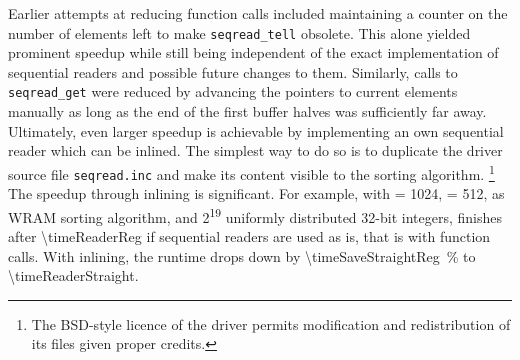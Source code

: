 Earlier attempts at reducing function calls included maintaining a counter on the number of elements left to make \lstinline|seqread_tell| obsolete.
This alone yielded prominent speedup while still being independent of the exact implementation of sequential readers and possible future changes to them.
Similarly, calls to \lstinline|seqread_get| were reduced by advancing the pointers to current elements manually as long as the end of the first buffer halves was sufficiently far away.
Ultimately, even larger speedup is achievable by implementing an own sequential reader which can be inlined.
The simplest way to do so is to duplicate the driver source file \lstinline|seqread.inc| and make its content visible to the sorting algorithm.%
\footnote{
	The BSD-style licence of the driver permits modification and redistribution of its files given proper credits.
}
The speedup through inlining is significant.
For example, with \cachesize{} = 1024, \seqreadcachesize{} = 512, \QS{} as WRAM sorting algorithm, and 2\textsuperscript{19} uniformly distributed 32-bit integers, \MS{} finishes after \qty[exponent-mode=fixed, fixed-exponent=9, round-mode=places, round-precision=2]{\timeReaderReg}{\cycle} if sequential readers are used as is, that is with function calls.
With inlining, the runtime drops down by \qty[round-mode=places, round-precision=0]{\timeSaveStraightReg}{\percent} to \qty[exponent-mode=fixed, fixed-exponent=9, round-mode=places, round-precision=2]{\timeReaderStraight}{\cycle}.

